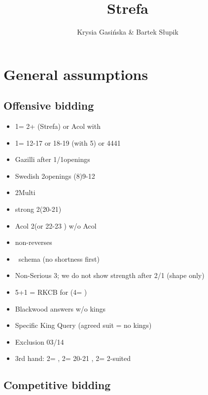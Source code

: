 \documentclass[12pt, a4paper]{report}
\title{\spades\clubs Strefa \xdiams\xhearts}
\author{Krysia Gasińska \& Bartek Słupik}
\begin{document}
\maketitle

\tableofcontents

\chapter*{\colorbox{Plum!30}{General assumptions}}
 {

    \section*{\colorbox{blue!30}{Offensive bidding}}
        \begin{itemize}
            \item 1\clubs = 2+ (Strefa) or Acol with \clubs
            \item 1\diams = 12-17 \unbal or 18-19 \bal (with 5\diams) or 4441
            \item Gazilli after 1\diams/1\major openings
            \item Swedish 2\major openings (8)9-12
            \item 2\diams Multi
            \item strong 2\nt (20-21)
            \item Acol 2\clubs (\gf or 22-23 \bal) w/o Acol \clubs 
            \item non-\gf reverses
            \item \lsf\ schema (no shortness first)
            \item Non-Serious 3\nt; we do not show strength after 2/1 (shape only)
            \item 5\minor+1 = RKCB for \minor (4\nt = \nat)
            \item Blackwood answers w/o kings
            \item Specific King Query (agreed suit = no kings)
            \item Exclusion 03/14
            \item 3rd hand: 2\nt = \minor, 2\diams = 20-21 \bal, 2\major = 2-suited
        \end{itemize}
    
    \section*{\colorbox{blue!30}{Competitive bidding}}

}
\end{document}
